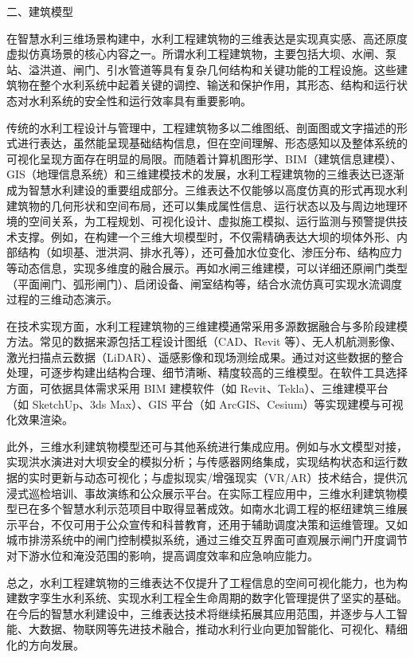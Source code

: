 二、建筑模型

在智慧水利三维场景构建中，水利工程建筑物的三维表达是实现真实感、高还原度虚拟仿真场景的核心内容之一。所谓水利工程建筑物，主要包括大坝、水闸、泵站、溢洪道、闸门、引水管道等具有复杂几何结构和关键功能的工程设施。这些建筑物在整个水利系统中起着关键的调控、输送和保护作用，其形态、结构和运行状态对水利系统的安全性和运行效率具有重要影响。

传统的水利工程设计与管理中，工程建筑物多以二维图纸、剖面图或文字描述的形式进行表达，虽然能呈现基础结构信息，但在空间理解、形态感知以及整体系统的可视化呈现方面存在明显的局限。而随着计算机图形学、BIM（建筑信息建模）、GIS（地理信息系统）和三维建模技术的发展，水利工程建筑物的三维表达已逐渐成为智慧水利建设的重要组成部分。三维表达不仅能够以高度仿真的形式再现水利建筑物的几何形状和空间布局，还可以集成属性信息、运行状态以及与周边地理环境的空间关系，为工程规划、可视化设计、虚拟施工模拟、运行监测与预警提供技术支撑。例如，在构建一个三维大坝模型时，不仅需精确表达大坝的坝体外形、内部结构（如坝基、泄洪洞、排水孔等），还可叠加水位变化、渗压分布、结构应力等动态信息，实现多维度的融合展示。再如水闸三维建模，可以详细还原闸门类型（平面闸门、弧形闸门）、启闭设备、闸室结构等，结合水流仿真可实现水流调度过程的三维动态演示。

在技术实现方面，水利工程建筑物的三维建模通常采用多源数据融合与多阶段建模方法。常见的数据来源包括工程设计图纸（CAD、Revit 等）、无人机航测影像、激光扫描点云数据（LiDAR）、遥感影像和现场测绘成果。通过对这些数据的整合处理，可逐步构建出结构合理、细节清晰、精度较高的三维模型。在软件工具选择方面，可依据具体需求采用 BIM 建模软件（如 Revit、Tekla）、三维建模平台（如 SketchUp、3ds Max）、GIS 平台（如 ArcGIS、Cesium）等实现建模与可视化效果渲染。

此外，三维水利建筑物模型还可与其他系统进行集成应用。例如与水文模型对接，实现洪水演进对大坝安全的模拟分析；与传感器网络集成，实现结构状态和运行数据的实时更新与动态可视化；与虚拟现实/增强现实（VR/AR）技术结合，提供沉浸式巡检培训、事故演练和公众展示平台。在实际工程应用中，三维水利建筑物模型已在多个智慧水利示范项目中取得显著成效。如南水北调工程的枢纽建筑三维展示平台，不仅可用于公众宣传和科普教育，还用于辅助调度决策和运维管理。又如城市排涝系统中的闸门控制模拟系统，通过三维交互界面可直观展示闸门开度调节对下游水位和淹没范围的影响，提高调度效率和应急响应能力。

总之，水利工程建筑物的三维表达不仅提升了工程信息的空间可视化能力，也为构建数字孪生水利系统、实现水利工程全生命周期的数字化管理提供了坚实的基础。在今后的智慧水利建设中，三维表达技术将继续拓展其应用范围，并逐步与人工智能、大数据、物联网等先进技术融合，推动水利行业向更加智能化、可视化、精细化的方向发展。

